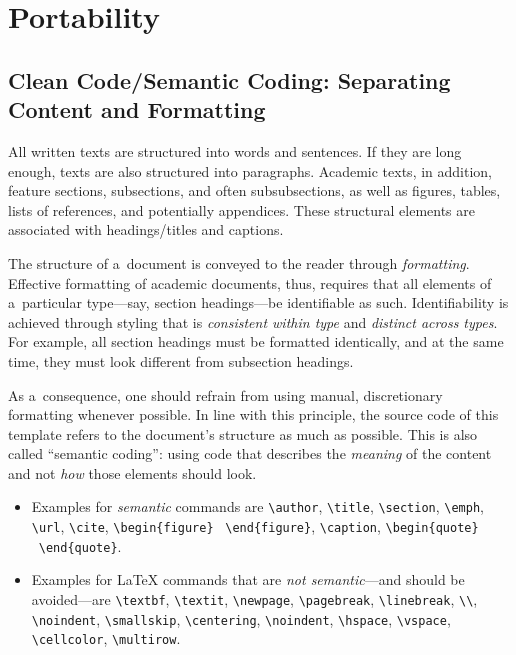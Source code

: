 


\section{Portability}
\label{sec:Portability}

\subsection{Clean Code/Semantic Coding: Separating Content and Formatting}

All written texts are structured into words and sentences. If they are long enough, texts are also structured into paragraphs. Academic texts, in addition, feature sections, subsections, and often subsubsections, as well as figures, tables, lists of references, and potentially appendices. These structural elements are associated with headings\slash titles and captions.

The structure of a~document is conveyed to the reader through \emph{formatting}. Effective formatting of academic documents, thus, requires that all elements of a~particular type---say, section headings---be identifiable as such. Identifiability is achieved through styling that is \emph{consistent within type} and \emph{distinct across types}. For example, all section headings must be formatted identically, and at the same time, they must look different from subsection headings.

As a~consequence, one should refrain from using manual, discretionary formatting whenever possible. In line with this principle, the source code of this template refers to the document's structure as much as possible. This is also called ``semantic coding'': using code that describes the \emph{meaning} of the content and not \emph{how} those elements should look.
\begin{itemize}
	\item Examples for \emph{semantic} commands are \verb|\author|, \verb|\title|, \verb|\section|,  \verb|\emph|, \verb|\url|, \verb|\cite|, \verb|\begin{figure}| \textellipsis\ \verb|\end{figure}|, \verb|\caption|, \verb|\begin{quote}| \textellipsis\ \verb|\end{quote}|.
	\item Examples for LaTeX commands that are \emph{not semantic}---and should be avoided---are \verb|\textbf|, \verb|\textit|, \verb|\newpage|, \verb|\pagebreak|, \verb|\linebreak|, \verb|\\|, \verb|\noindent|, \verb|\smallskip|, \verb|\centering|, \verb|\noindent|, \verb|\hspace|, \verb|\vspace|, \verb|\cellcolor|, \verb|\multirow|.
\end{itemize}

